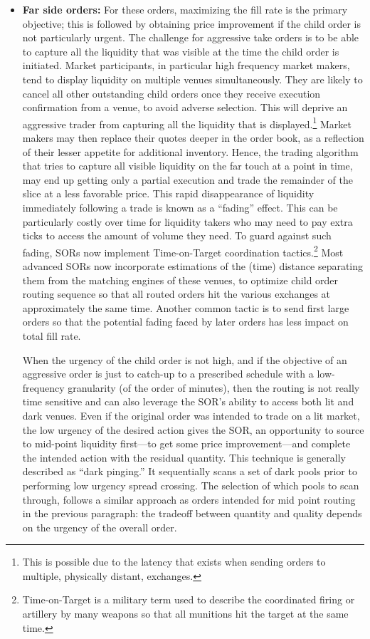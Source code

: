 \begin{itemize}
\item \textbf{Far side orders:} For these orders, maximizing the fill rate is the primary objective; this is followed by obtaining price improvement if the child order is not particularly urgent. The challenge for aggressive take orders is to be able to capture all the liquidity that was visible at the time the child order is initiated. Market participants, in particular high frequency market makers, tend to display liquidity on multiple venues simultaneously. They are likely to cancel all other outstanding child orders once they receive execution confirmation from a venue, to avoid adverse selection. This will deprive an aggressive trader from capturing all the liquidity that is displayed.\footnote{This is possible due to the latency that exists when sending orders to multiple, physically distant, exchanges.} Market makers may then replace their quotes deeper in the order book, as a reflection of their lesser appetite for additional inventory. Hence, the trading algorithm that tries to capture all visible liquidity on the far touch at a point in time, may end up getting only a partial execution and trade the remainder of the slice at a less favorable price. This rapid disappearance of liquidity immediately following a trade is known as a ``fading'' effect. This can be particularly costly over time for liquidity takers who may need to pay extra ticks to access the amount of volume they need. To guard against such fading, SORs now implement Time-on-Target coordination tactics.\footnote{Time-on-Target is a military term used to describe the coordinated firing or artillery by many weapons so that all munitions hit the target at the same time.} Most advanced SORs now incorporate estimations of the (time) distance separating them from the matching engines of these venues, to optimize child order routing sequence so that all routed orders hit the various exchanges at approximately the same time. Another common tactic is to send first large orders so that the potential fading faced by later orders has less impact on total fill rate. 

When the urgency of the child order is not high, and if the objective of an aggressive order is just to catch-up to a prescribed schedule with a low-frequency granularity (of the order of minutes), then the routing is not really time sensitive and can also leverage the SOR's ability to access both lit and dark venues. Even if the original order was intended to trade on a lit market, the low urgency of the desired action gives the SOR, an opportunity to source to mid-point liquidity first---to get some price improvement---and complete the intended action with the residual quantity. This technique is generally described as ``dark pinging.'' It sequentially scans a set of dark pools prior to performing low urgency spread crossing. The selection of which pools to scan through, follows a similar approach as orders intended for mid point routing in the previous paragraph: the tradeoff between quantity and quality depends on the urgency of the overall order.
\end{itemize}


